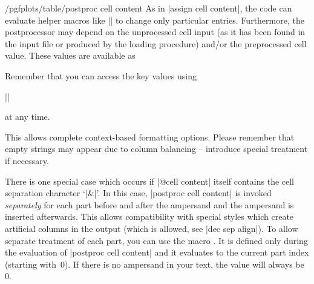 \documentclass[a4paper]{ltxdoc}
\begin{document}
\begin{codekey}{/pgfplots/table/postproc cell content}
    As in |assign cell content|, the code can evaluate helper macros like
    |\pgfplotstablerow| to change only particular entries. Furthermore, the
    postprocessor may depend on the unprocessed cell input (as it has been
    found in the input file or produced by the loading procedure) and/or the
    preprocessed cell value. These values are available as
    Remember that you can access the key values using

    ||

    at any time.

    This allows complete context-based formatting options. Please remember that
    empty strings may appear due to column balancing -- introduce special
    treatment if necessary.

    There is one special case which occurs if |@cell content| itself contains
    the cell separation character `|&|'. In this case, |postproc cell content|
    is invoked \emph{separately} for each part before and after the ampersand
    and the ampersand is inserted afterwards. This allows compatibility with
    special styles which create artificial columns in the output (which is
    allowed, see |dec sep align|). To allow separate treatment of each part,
    you can use the macro \declareandlabel{\pgfplotstablepartno}. It is defined
    only during the evaluation of |postproc cell content| and it evaluates to
    the current part index (starting with~$0$). If there is no ampersand in
    your text, the value will always be~$0$.


\end{codekey}
\end{document}
